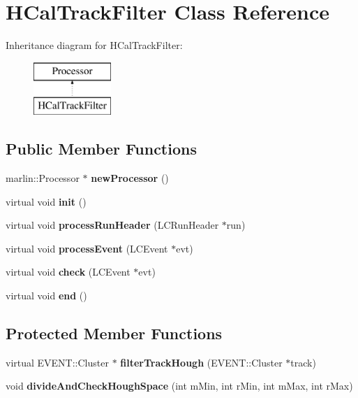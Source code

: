 \section{H\-Cal\-Track\-Filter Class Reference}
\label{classHCalTrackFilter}
Inheritance diagram for H\-Cal\-Track\-Filter\-:\begin{figure}[H]
\begin{center}
\leavevmode
\includegraphics[height=2.000000cm]{classHCalTrackFilter}
\end{center}
\end{figure}
\subsection*{Public Member Functions}
\begin{DoxyCompactItemize}
\item 
marlin\-::\-Processor $\ast$ {\bfseries new\-Processor} ()\label{classHCalTrackFilter_a42fae3a98615aaf4f163401d2156b091}

\item 
virtual void {\bf init} ()
\item 
virtual void {\bf process\-Run\-Header} (L\-C\-Run\-Header $\ast$run)
\item 
virtual void {\bf process\-Event} (L\-C\-Event $\ast$evt)
\item 
virtual void {\bfseries check} (L\-C\-Event $\ast$evt)\label{classHCalTrackFilter_a140c52dc7476c0116033173bea32e589}

\item 
virtual void {\bf end} ()
\end{DoxyCompactItemize}
\subsection*{Protected Member Functions}
\begin{DoxyCompactItemize}
\item 
virtual E\-V\-E\-N\-T\-::\-Cluster $\ast$ {\bfseries filter\-Track\-Hough} (E\-V\-E\-N\-T\-::\-Cluster $\ast$track)\label{classHCalTrackFilter_a212d7686c61f5b50f9ca0364d49eae94}

\item 
void {\bfseries divide\-And\-Check\-Hough\-Space} (int m\-Min, int r\-Min, int m\-Max, int r\-Max)\label{classHCalTrackFilter_a2fe6db1741b034405180f79e07d7b991}

\end{DoxyCompactItemize}
